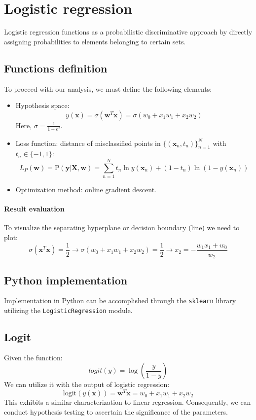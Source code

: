 \section{Logistic regression}

Logistic regression functions as a probabilistic discriminative approach by directly assigning probabilities to elements belonging to certain sets.

\subsection{Functions definition}
To proceed with our analysis, we must define the following elements:
\begin{itemize}
    \item Hypothesis space: 
        \[y(\textbf{x})=\sigma(\textbf{w}^T\textbf{x})=\sigma(w_0+x_1w_1+x_2w_2)\]
        Here, $\sigma=\frac{1}{1+e^{z}}$. 
    \item Loss function: distance of misclassified points in ${\{(\textbf{x}_n, t_n)\}}^{N}_{n=1}$ with $t_n\in\{-1,1\}$: 
        \[L_P(\textbf{w})=\text{P}(\textbf{y}|\textbf{X},\textbf{w})=\sum_{n=1}^N t_n\ln y(\textbf{x}_n)+\left(1-t_n\right)\ln(1-y(\textbf{x}_n))\]
    \item Optimization method: online gradient descent.
\end{itemize}

\paragraph*{Result evaluation}
To visualize the separating hyperplane or decision boundary (line) we need to plot:
\[\sigma(\textbf{x}^T\textbf{x}) = \dfrac{1}{2} \rightarrow \sigma(w_0 + x_1w_1 + x_2w_2) = \dfrac{1}{2} \rightarrow x_2=-\dfrac{w_1x_1+w_0}{w_2}\]


\subsection{Python implementation}
Implementation in Python can be accomplished through the \texttt{sklearn} library utilizing the \texttt{LogisticRegression} module.

\subsection{Logit}
Given the function:
\[\textit{logit}(y)=\log\left(\dfrac{y}{1-y}\right)\]
We can utilize it with the output of logistic regression:
\[\text{logit}(y(\textbf{x}))=\textbf{w}^T\textbf{x}=w_0+x_1w_1+x_2w_2\]
This exhibits a similar characterization to linear regression. 
Consequently, we can conduct hypothesis testing to ascertain the significance of the parameters.